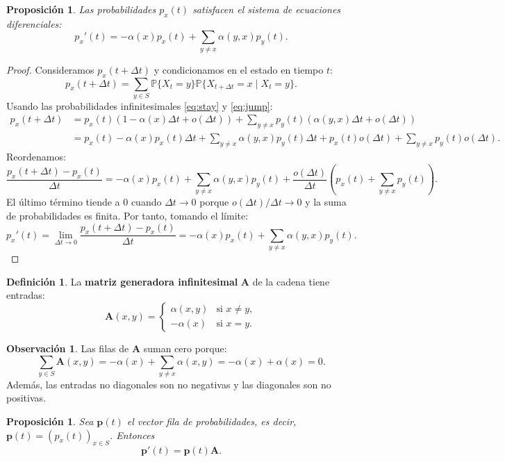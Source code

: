 \documentclass{article}
\theoremstyle{plain}
\newtheorem{Proposicion}[Teorema]{Proposici\'on}
\theoremstyle{definition}
\newtheorem{Definicion}[Teorema]{Definici\'on}
\newtheorem{Observacion}[Teorema]{Observaci\'on}
\newcommand{\Prob}{\mathbb{P}}
\newcommand{\A}{\mathbf{A}}
\newcommand{\p}{\mathbf{p}}
\begin{document}
\begin{Proposicion}
  Las probabilidades $p_x(t)$ satisfacen el sistema de ecuaciones diferenciales:
  \[ p_x'(t) = -\alpha(x)p_x(t) + \sum_{y \neq x} \alpha(y,x)p_y(t). \]
\end{Proposicion}

\begin{proof}
  Consideramos $p_x(t+\Delta t)$ y condicionamos en el estado en tiempo $t$:
  \[
  p_x(t+\Delta t) = \sum_{y \in S} \Prob\{X_t = y\} \Prob\{X_{t+\Delta t} = x \mid X_t = y\}.
  \]
  Usando las probabilidades infinitesimales \eqref{eq:stay} y \eqref{eq:jump}:
  \begin{align*}
    p_x(t+\Delta t) &= p_x(t)(1 - \alpha(x)\Delta t + o(\Delta t)) + \sum_{y \neq x} p_y(t)(\alpha(y,x)\Delta t + o(\Delta t)) \\
    &= p_x(t) - \alpha(x)p_x(t)\Delta t + \sum_{y \neq x} \alpha(y,x)p_y(t)\Delta t + p_x(t)o(\Delta t) + \sum_{y \neq x} p_y(t)o(\Delta t).
  \end{align*}
  Reordenamos:
  \[
  \frac{p_x(t+\Delta t) - p_x(t)}{\Delta t} = -\alpha(x)p_x(t) + \sum_{y \neq x} \alpha(y,x)p_y(t) + \frac{o(\Delta t)}{\Delta t}\left(p_x(t) + \sum_{y \neq x} p_y(t)\right).
  \]
  El \'ultimo t\'ermino tiende a 0 cuando $\Delta t \to 0$ porque $o(\Delta t)/\Delta t \to 0$ y la suma de probabilidades es finita. Por tanto, tomando el l\'imite:
  \[
  p_x'(t) = \lim_{\Delta t \to 0} \frac{p_x(t+\Delta t) - p_x(t)}{\Delta t} = -\alpha(x)p_x(t) + \sum_{y \neq x} \alpha(y,x)p_y(t).
  \]
\end{proof}

\begin{Definicion}
  La \textbf{matriz generadora infinitesimal} $\A$ de la cadena tiene entradas:
  \[ \A(x,y) = \begin{cases}
    \alpha(x,y) & \text{si } x \neq y,\\
    -\alpha(x) & \text{si } x = y.
  \end{cases} \]
\end{Definicion}

\begin{Observacion}
  Las filas de $\A$ suman cero porque:
  \[ \sum_{y \in S} \A(x,y) = -\alpha(x) + \sum_{y \neq x} \alpha(x,y) = -\alpha(x) + \alpha(x) = 0. \]
  Adem\'as, las entradas no diagonales son no negativas y las diagonales son no positivas.
\end{Observacion}

\begin{Proposicion}
  Sea $\p(t)$ el vector fila de probabilidades, es decir, $\p(t) = (p_x(t))_{x \in S}$. Entonces
  \[ \p'(t) = \p(t)\A. \]
\end{Proposicion}
\end{document}
